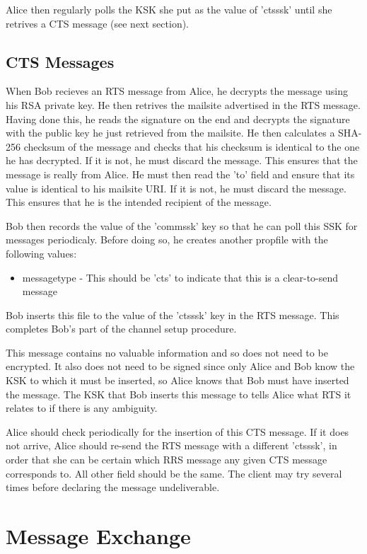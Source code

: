 \documentclass[12pt,a4paper]{article}
\begin{document}
Alice then regularly polls the KSK she put as the value of 'ctsssk' until she retrives a CTS message (see next section).

\subsection{CTS Messages}
When Bob recieves an RTS message from Alice, he decrypts the message using his RSA private key. He then retrives the mailsite advertised in the RTS message. Having done this, he reads the signature on the end and decrypts the signature with the public key he just retrieved from the mailsite. He then calculates a SHA-256 checksum of the message and checks that his checksum is identical to the one he has decrypted. If it is not, he must discard the message. This ensures that the message is really from Alice. He must then read the 'to' field and ensure that its value is identical to his mailsite URI. If it is not, he must discard the message. This ensures that he is the intended recipient of the message.

Bob then records the value of the 'commssk' key so that he can poll this SSK for messages periodicaly. Before doing so, he creates another propfile with the following values:

\begin{itemize}
\item messagetype - This should be 'cts' to indicate that this is a clear-to-send message
\end{itemize}

Bob inserts this file to the value of the 'ctsssk' key in the RTS message. This completes Bob's part of the channel setup procedure.

This message contains no valuable information and so does not need to be encrypted. It also does not need to be signed since only Alice and Bob know the KSK to which it must be inserted, so Alice knows that Bob must have inserted the message. The KSK that Bob inserts this message to tells Alice what RTS it relates to if there is any ambiguity.

Alice should check periodically for the insertion of this CTS message. If it does not arrive, Alice should re-send the RTS message with a different 'ctsssk', in order that she can be certain which RRS message any given CTS message corresponds to. All other field should be the same. The client may try several times before declaring the message undeliverable.

\section{Message Exchange}
\end{document}
